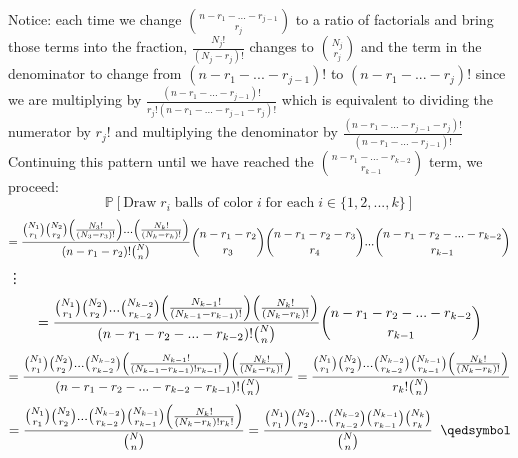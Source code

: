 \documentclass{article}
\begin{document}
\begin{center}
    \break
    Notice: each time we change $\binom{n-r_1-...-r_{j-1}}{r_j}$ to a ratio of factorials and bring those terms into the fraction, $\frac{N_j!}{(N_j-r_j)!}$ changes to $\binom{N_j}{r_j}$ and the term in the denominator to change from $(n-r_1-...-r_{j-1})!$ to $(n-r_1-...-r_j)!$ since we are multiplying by $\frac{(n-r_1-...-r_{j-1})!}{r_j!(n-r_1-...-r_{j-1}-r_j)!}$ which is equivalent to dividing the numerator by $r_j!$ and multiplying the denominator by $\frac{(n-r_1-...-r_{j-1}-r_j)!}{(n-r_1-...-r_{j-1})!}$
    \newpage
    Continuing this pattern until we have reached the $\binom{n-r_1-...-r_{k-2}}{r_{k-1}}$ term, we proceed:
    \[\mathbb{P}[\mbox{Draw}\;r_i\;\mbox{balls of color}\;i\;\mbox{for each}\;i\in\{1, 2, ..., k\}]\]
    \[=\frac{\binom{N_1}{r_1}\binom{N_2}{r_2}\Big{(}\frac{N_3!}{(N_3 - r_3)!}\Big{)}...\Big{(}\frac{N_k!}{(N_k - r_k)!}\Big{)}}{(n-r_1-r_2)!\binom{N}{n}}\binom{n-r_1-r_2}{r_3}\binom{n-r_1-r_2-r_3}{r_4}...\binom{n-r_1-r_2-...-r_{k-2}}{r_{k-1}}\]
    \vdots
    \[=\frac{\binom{N_1}{r_1}\binom{N_2}{r_2}...\binom{N_{k-2}}{r_{k-2}}\Big{(}\frac{N_{k-1}!}{(N_{k-1} - r_{k-1})!}\Big{)}\Big{(}\frac{N_k!}{(N_k - r_k)!}\Big{)}}{(n-r_1-r_2-...-r_{k-2})!\binom{N}{n}}\binom{n-r_1-r_2-...-r_{k-2}}{r_{k-1}}\]
    \[=\frac{\binom{N_1}{r_1}\binom{N_2}{r_2}...\binom{N_{k-2}}{r_{k-2}}\Big{(}\frac{N_{k-1}!}{(N_{k-1} - r_{k-1})!r_{k-1}!}\Big{)}\Big{(}\frac{N_k!}{(N_k - r_k)!}\Big{)}}{(n-r_1-r_2-...-r_{k-2}-r_{k-1})!\binom{N}{n}} =\frac{\binom{N_1}{r_1}\binom{N_2}{r_2}...\binom{N_{k-2}}{r_{k-2}}\binom{N_{k-1}}{r_{k-1}}\Big{(}\frac{N_k!}{(N_k - r_k)!}\Big{)}}{r_k!\binom{N}{n}}\]
    \[=\frac{\binom{N_1}{r_1}\binom{N_2}{r_2}...\binom{N_{k-2}}{r_{k-2}}\binom{N_{k-1}}{r_{k-1}}\Big{(}\frac{N_k!}{(N_k - r_k)!r_k!}\Big{)}}{\binom{N}{n}} =\frac{\binom{N_1}{r_1}\binom{N_2}{r_2}...\binom{N_{k-2}}{r_{k-2}}\binom{N_{k-1}}{r_{k-1}}\binom{N_k}{r_k}}{\binom{N}{n}}\;\;\qedsymbol\]
\end{center}
\end{document}
